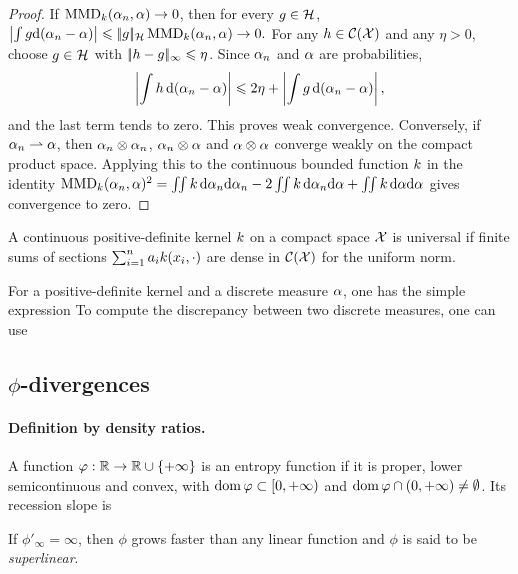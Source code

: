 \begin{proof}
If $\operatorname{MMD}_{k}(\alpha_n,\alpha)\to0$, then for every $g\in\mathcal{H}$, \(\left\lvert\int g\mathrm{d}(\alpha_n-\alpha)\right\rvert \leqslant |\!| g |\!|_{\mathcal{H}}\operatorname{MMD}_{k}(\alpha_n,\alpha)\to0.\)
For any $h\in\mathcal{C}(\mathcal{X})$ and any $\eta>0$, choose $g\in\mathcal{H}$ with $|\!| h-g |\!|_\infty\leqslant\eta$. Since $\alpha_n$ and $\alpha$ are probabilities,
\[
\left|\int h\,\mathrm{d}(\alpha_n-\alpha)\right|
\leqslant
2\eta+\left|\int g\,\mathrm{d}(\alpha_n-\alpha)\right|,
\]
and the last term tends to zero. This proves weak convergence. Conversely, if $\alpha_n\rightharpoonup\alpha$, then $\alpha_n\otimes\alpha_n$, $\alpha_n\otimes\alpha$ and $\alpha\otimes\alpha$ converge weakly on the compact product space. Applying this to the continuous bounded function $k$ in the identity
\(\operatorname{MMD}_{k}(\alpha_n,\alpha)^2 = \iint k\,\mathrm{d}\alpha_n\mathrm{d}\alpha_n -2\iint k\,\mathrm{d}\alpha_n\mathrm{d}\alpha +\iint k\,\mathrm{d}\alpha\mathrm{d}\alpha\)
gives convergence to zero.
\end{proof}
\begin{defn}\label{def-universal-kernel}
A continuous positive-definite kernel $k$ on a compact space $\mathcal{X}$ is universal if finite sums of sections $\sum_{i=1}^n a_ik(x_i,\cdot)$ are dense in $\mathcal{C}(\mathcal{X})$ for the uniform norm.
\end{defn}
For a positive-definite kernel and a discrete measure $\alpha$, one has the simple expression
To compute the discrepancy between two discrete measures, one can use
\subsection{\texorpdfstring{$\phi$-divergences}{phi-divergences}}
\label{sec-phi-div}
\paragraph{Definition by density ratios.}
\begin{defn}
\label{def_entropy}
A function $\varphi: \mathbb{R} \to \mathbb{R} \cup \{+\infty\}$ is an entropy function if it is proper, lower semicontinuous and convex, with $\operatorname{dom} \varphi\subset [0,+\infty)$ and $\operatorname{dom} \varphi \cap (0,+\infty) \neq \emptyset$. Its recession slope is
\end{defn}
If $\phi'_\infty = \infty$, then $\phi$ grows faster than any linear function and $\phi$ is said to be \emph{superlinear}.

